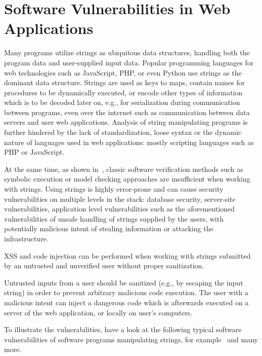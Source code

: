 
\section{Software Vulnerabilities in Web Applications}

Many programs utilize strings as ubiquitous data structures, handling both the program data and user-supplied input data.
Popular programming languages for web technologies such as JavaScript, PHP, or even Python use strings as the dominant data structure. Strings are used as keys to maps, contain names for procedures to be dynamically executed, or encode other types of information which is to be decoded later on, e.g., for serialization during communication between programs, even over the internet such as communication between data servers and user web applications.
Analysis of string manipulating programs is further hindered by the lack of standardization, loose syntax or the dynamic nature of languages used in web applications: mostly scripting languages such as PHP or JavaScript.

At the same time, as shown in~\cite{analjschallenges17}, classic software verification methods such as symbolic execution or model checking approaches are insufficient when working with strings.
Using strings is highly error-prone and can cause security vulnerabilities on multiple levels in the stack: database security, server-site vulnerabilities, application level vulnerabilities such as the aforementioned vulnerabilities of unsafe handling of strings supplied by the users, with potentially malicious intent of stealing information or attacking the infrastructure.

XSS and code injection can be performed when working with strings submitted by an untrusted and unverified user without proper sanitization.

Untrusted inputs from a user should be sanitized (e.g., by escaping the input string) in order to prevent arbitrary malicious code execution.
The user with a malicious intent can inject a dangerous code which is afterwards executed on a server of the web application, or locally on user's computers.

To illustrate the vulnerabilities, have a look at the following typical software vulnerabilities of software programs manipulating strings, for example~\cite{replace_nfts_model_ModelingRegularReplacementForStringConstraintSolving_DBLP:conf/nfm/FuL10,kern14} and many more.

